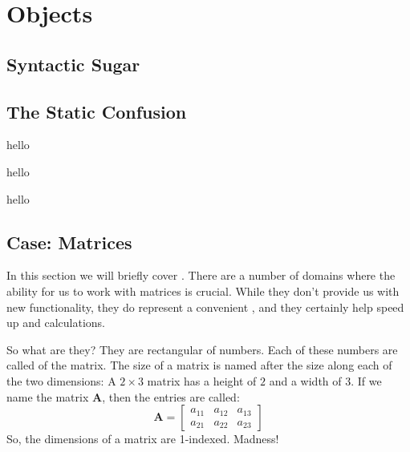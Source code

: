 \chapter{Objects}




\section{Syntactic Sugar}



\section{The Static Confusion}



\csharpsection{\csharp}
hello

hello

hello

\section{Case: Matrices}

In this section we will briefly cover . There are a number of domains where the ability for us to work with matrices is crucial. While they don't provide us with new functionality, they do represent a convenient , and they certainly help speed up  and  calculations.

So what are they? They are rectangular  of numbers. Each of these numbers are called  of the matrix. The size of a matrix is named after the size along each of the two dimensions: A $2 \times 3$ matrix has a height of $2$ and a width of $3$. If we name the matrix $\mathbf{A}$, then the entries are called:
\begin{equation*}
  \mathbf{A} =
  \left[
    \begin{matrix}
      a_{11} & a_{12} & a_{13} \\
      a_{21} & a_{22} & a_{23}
    \end{matrix}
  \right]
\end{equation*}
So, the dimensions of a matrix are 1-indexed. Madness!

